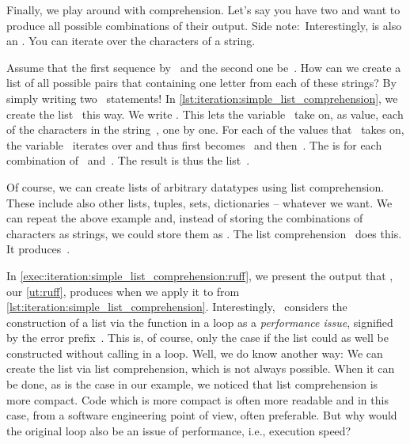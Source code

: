 Finally, we play around with  comprehension.
Let's say you have two  and want to produce all possible combinations of their output.
Side note:~Interestingly,  is also an .
You can iterate over the characters of a string.

Assume that the first sequence by~ and the second one be~.
How can we create a list of all possible pairs that containing one letter from each of these strings?
By simply writing two ~statements!
In \cref{lst:iteration:simple_list_comprehension}, we create the list~ this way.
We write .
This lets the variable~ take on, as value, each of the characters in the string~, one by one.
For each of the values that~ takes on, the variable~ iterates over  and thus first becomes~ and then~.
The   is  for each combination of~ and~.
The result is thus the list~\pythonil{["ax", "ay", "bx", "by", "cx", "cy"]}.%
%
\begin{sloppypar}%
Of course, we can create lists of arbitrary datatypes using list comprehension.
These include also other lists, tuples, sets, dictionaries -- whatever we want.
We can repeat the above example and, instead of storing the combinations of characters as strings, we could store them as .
The list comprehension~ does this.
It produces~\pythonil{[(\"a\", \"x\"), (\"a\", \"y\"), (\"b\", \"x\"), (\"b\", \"y\"), (\"c\", \"x\"), (\"c\", \"y\")]}.
\end{sloppypar}%
%
In \cref{exec:iteration:simple_list_comprehension:ruff}, we present the output that \ruff, our \cref{ut:ruff}, produces when we apply it to  from \cref{lst:iteration:simple_list_comprehension}.
Interestingly, \ruff\ considers the construction of a list via the  function in a loop as a \emph{performance issue}, signified by the error prefix~.
This is, of course, only the case if the list could as well be constructed without calling  in a loop.
Well, we do know another way:
We can create the list via list comprehension, which is not always possible.
When it can be done, as is the case in our example, we noticed that list comprehension is more compact.
Code which is more compact is often more readable and in this case, from a software engineering point of view, often preferable.
But why would the original loop also be an issue of performance, i.e., execution speed?

